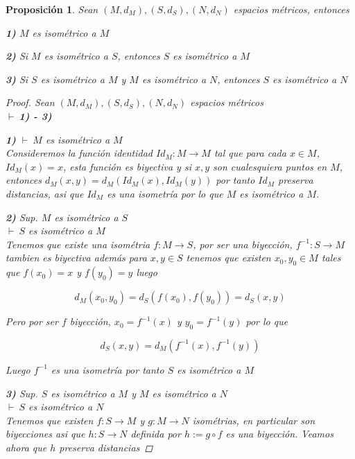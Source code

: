\documentclass[oneside]{book} %
\theoremstyle{Teorema}
\newtheorem{Proposicion}[Definicion]{Proposición}
\theoremstyle{Ejemplos}
\theoremstyle{[Obs]}
\renewcommand{\{}{\left\lbrace} %
\renewcommand{\}}{\right\rbrace} %
\newcommand{\pd}{$\vdash\ $} %
\begin{document}
			\begin{Proposicion}\setlength{\parindent}{0em}
				
				Sean $(M, d_M), (S, d_S), (N, d_N)$ espacios métricos, entonces 

				\textbf{1)} $M$ es isométrico a $M$ 

				\textbf{2)} Si $M$ es isométrico a $S$, entonces $S$ es isométrico a $M$ 

				\textbf{3)} Si $S$ es isométrico a $M$ y $M$ es isométrico a $N$, entonces $S$ es isométrico a $N$ 

				\begin{proof}
					
					Sean $(M, d_M), (S, d_S), (N, d_N)$ espacios métricos \\
					\pd \textbf{1) - 3)}

					\textbf{1)} \pd $M$ es isométrico a $M$ \\
					Consideremos la función identidad $Id_{M} : M \to M$ tal que para cada $x \in M$, $Id_{M}(x) = x$, esta función es biyectiva y si $x, y$ son cualesquiera puntos en $M$, entonces $d_M(x, y) = d_M(Id_{M}(x), Id_{M}(y))$ por tanto $Id_{M}$ preserva distancias, asi que $Id_{M}$ es una isometría por lo que $M$ es isométrico a $M$.

					\textbf{2)} Sup. $M$ es isométrico a $S$ \\
					\pd $S$ es isométrico a $M$ \\
					Tenemos que existe una isométria $f : M \to S$, por ser una biyección, $f^{-1} : S \to M$ tambien es biyectiva además para $x, y \in S$ tenemos que existen $x_0, y_0 \in M$ tales que $f(x_0) = x$ y $f(y_0) = y$ luego 

					\[ d_M(x_0, y_0) = d_S(f(x_0), f(y_0)) = d_S(x, y) \]

					Pero por ser $f$ biyección, $x_0 = f^{-1}(x)$ y $y_0 = f^{-1}(y)$ por lo que

					\[ d_S(x, y) = d_M( f^{-1}(x), f^{-1}(y) ) \]

					Luego $f^{-1}$ es una isometría por tanto $S$ es isométrico a $M$

					\textbf{3)} Sup. $S$ es isométrico a $M$ y $M$ es isométrico a $N$ \\
					\pd $S$ es isométrico a $N$ \\
					Tenemos que existen $f : S \to M$ y $g : M \to N$ isométrias, en particular son biyecciones asi que $h : S \to N$ definida por $h := g \circ f$ es una biyección. Veamos ahora que $h$ preserva distancias 
					

\end{proof}
\end{Proposicion}
\end{document}
